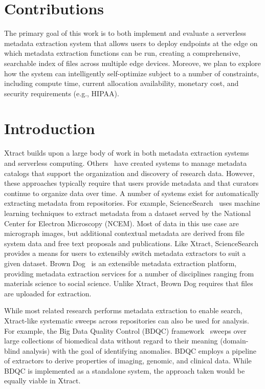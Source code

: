 \documentclass[sigconf]{acmart}
\newcommand{\tyler}[1]{}
\newcommand{\tyler}[1]{{\textcolor{cyan}{ tyler: #1 }}}
\newcommand{\name}{Xtract}
\begin{document}
\section{Contributions}

\tyler{merge these (as bullets?) into intro text}
The primary goal of this work is to both implement and evaluate a serverless metadata extraction system
that allows users to deploy endpoints at the edge on which metadata extraction functions can be run, 
creating a comprehensive, searchable index of files across multiple edge devices. Moreove, we plan to 
explore how the system can intelligently self-optimize subject to a number of constraints, including compute time, 
current allocation availability, monetary cost, and security requirements (e.g., HIPAA). 

\section{Introduction}

\tyler{Intro lead-in here}


\name{} builds upon a large body of work in both metadata extraction systems and serverless computing.
Others~\cite{egan2003vizier, welter2013nhgri, irods, dataverse} have created 
systems to manage metadata catalogs that
support the organization and discovery of research data. However, these approaches typically 
require that users provide metadata and that curators continue to organize data over time. 
A number of systems exist for automatically extracting metadata from repositories. 
For example, ScienceSearch~\cite{rodrigo2018sciencesearch} uses 
machine learning techniques to extract metadata from a dataset served by the National Center for Electron Microscopy (NCEM). 
Most of data in this use case are micrograph images, but additional contextual metadata are derived from file system 
data and free text proposals and publications. Like \name{}, ScienceSearch 
provides a means for users to extensibly switch metadata extractors to suit a given dataset.  
Brown Dog~\cite{padhy2015brown} is an extensible metadata extraction platform, 
providing metadata extraction services for a number of 
disciplines ranging from materials science to social science.
Unlike \name{}, Brown Dog requires that files are uploaded for extraction. 

While most related research performs metadata extraction to enable search,
\name{}-like systematic sweeps across repositories can also be used for analysis.  
For example, the Big Data Quality Control (BDQC) framework~\cite{deutsch2018bdqc} sweeps over 
large collections of biomedical data without regard to their meaning (domain-blind analysis) with the goal of
identifying anomalies.
BDQC employs a pipeline of extractors to derive properties of imaging, genomic, and clinical data.
While BDQC is implemented as a standalone system, the approach taken would be equally 
viable in \name{}.
\end{document}
